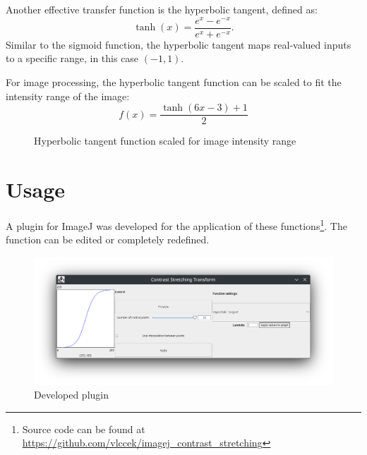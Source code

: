 \documentclass[a4paper]{article}
\begin{document}
Another effective transfer function is the hyperbolic tangent, defined as:
\begin{equation}
\tanh(x) = \frac{e^x - e^{-x}}{e^x + e^{-x}}.
\end{equation}
Similar to the sigmoid function, the hyperbolic tangent maps real-valued inputs to a specific range, in this case $(-1, 1)$.

For image processing, the hyperbolic tangent function can be scaled to fit the intensity range of the image:
\begin{equation}
f(x) = \frac{\tanh(6x-3)+1}{2} 
\end{equation}

\begin{figure}[h!]
\centering
{}
\caption{Hyperbolic tangent function scaled for image intensity range}
\end{figure}

\section{Usage}

A plugin for ImageJ was developed for the application of these functions\footnote{Source code can be found at \url{https://github.com/vlccek/imagej_contrast_stretching}}. The function can be edited or completely redefined.

\begin{figure}[h!]
    \centering
    \includegraphics[width=1.1\linewidth]{plugin.png}
    \caption{Developed plugin}
    \label{fig:enter-label}
\end{figure}
\end{document}
